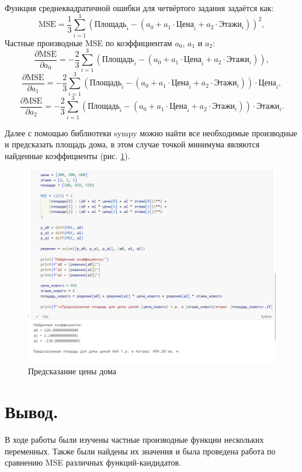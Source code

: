 \documentclass[14pt,a4paper]{extarticle}
\begin{document}
Функция среднеквадратичной ошибки для четвёртого задания задаётся как:
\[
\text{MSE} = \frac{1}{3} \sum_{i=1}^3 \left( \text{Площадь}_i - (a_0 + a_1 \cdot \text{Цена}_i + a_2 \cdot \text{Этажи}_i) \right)^2,
\]
Частные производные MSE по коэффициентам $a_0$, $a_1$ и $a_2$:
\[
\frac{\partial \text{MSE}}{\partial a_0} = -\frac{2}{3} \sum_{i=1}^3 \left( \text{Площадь}_i - (a_0 + a_1 \cdot \text{Цена}_i + a_2 \cdot \text{Этажи}_i) \right),
\]
\[
\frac{\partial \text{MSE}}{\partial a_1} = -\frac{2}{3} \sum_{i=1}^3 \left( \text{Площадь}_i - (a_0 + a_1 \cdot \text{Цена}_i + a_2 \cdot \text{Этажи}_i) \right) \cdot \text{Цена}_i,
\]
\[
\frac{\partial \text{MSE}}{\partial a_2} = -\frac{2}{3} \sum_{i=1}^3 \left( \text{Площадь}_i - (a_0 + a_1 \cdot \text{Цена}_i + a_2 \cdot \text{Этажи}_i) \right) \cdot \text{Этажи}_i.
\]

Далее с помощью библиотеки sympy можно найти все необходимые
производные и предсказать площадь дома,
в этом случае точкой минимума являются найденные коэффициенты (рис. \ref{pic:house}).

\begin{figure}[h!]
    \centering
    \includegraphics[scale=0.66]{pic6/4.png}
    \caption{Предсказание цены дома}
    \label{pic:house}
\end{figure}
\FloatBarrier

\section*{Вывод.}

В ходе работы были изучены частные производные функции нескольких переменных.
Также были найдены их значения и была проведена работа по сравнению MSE
различных функций-кандидатов.
\end{document}
